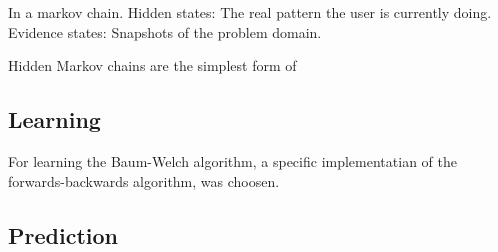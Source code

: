  In a markov chain.
Hidden states: The real pattern the user is currently doing.
Evidence states: Snapshots of the problem domain.

Hidden Markov chains are the simplest form of

\subsection{Learning}
For learning the Baum-Welch algorithm, a specific implementatian of the forwards-backwards algorithm, was choosen.

\subsection{Prediction}
